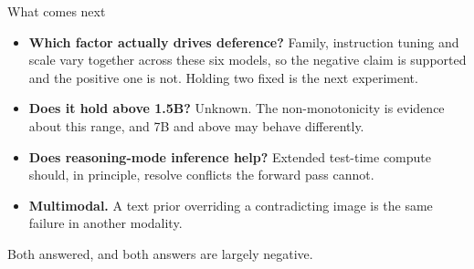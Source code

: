 \documentclass[aspectratio=169]{beamer}
\begin{document}
\begin{frame}{What comes next}
  \begin{itemize}\setlength\itemsep{0.9em}
    \item \textbf{Which factor actually drives deference?} Family, instruction
          tuning and scale vary together across these six models, so the negative
          claim is supported and the positive one is not. Holding two fixed is the
          next experiment.
    \item \textbf{Does it hold above 1.5B?} Unknown. The non-monotonicity is
          evidence about this range, and 7B and above may behave differently.
    \item \textbf{Does reasoning-mode inference help?} Extended test-time compute
          should, in principle, resolve conflicts the forward pass cannot.
    \item \textbf{Multimodal.} A text prior overriding a contradicting image is the
          same failure in another modality.
  \end{itemize}
  \vspace{0.5em}
  \begin{center}\color{muted}\small
    Both answered, and both answers are largely negative.
  \end{center}
\end{frame}
\end{document}
